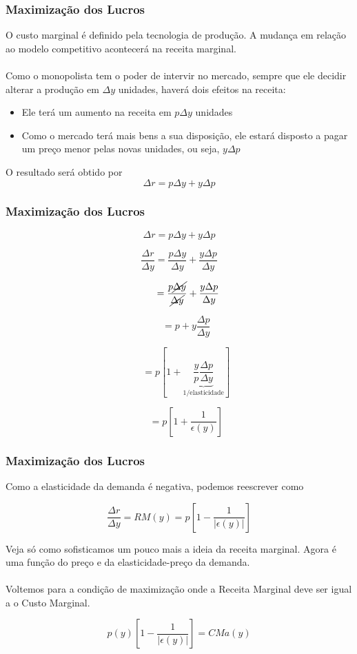 \documentclass{beamer}[10]
\begin{document}
\begin{frame}
	\frametitle{Maximização dos Lucros}

	O custo marginal é definido pela tecnologia de produção. A mudança em relação ao modelo competitivo acontecerá na receita marginal.
	\\~\\
	Como o monopolista tem o poder de intervir no mercado, sempre que ele decidir alterar a produção em $\Delta y$ unidades, haverá dois efeitos na receita:
	\begin{itemize}
		\item Ele terá um aumento na receita em $p\Delta y$ unidades
		\item Como o mercado terá mais bens a sua disposição, ele estará disposto a pagar um preço menor pelas novas unidades, ou seja, $y\Delta p$
	\end{itemize}

	O resultado será obtido por
	$$\Delta r = p \Delta y + y \Delta p$$
\end{frame}

\begin{frame}
	\frametitle{Maximização dos Lucros}

	\small $$\Delta r = p \Delta y + y \Delta p$$

	$$ \frac{\Delta r}{\Delta y} = 
	\frac{p \Delta y}{\Delta y} + 
	\frac{y \Delta p}{\Delta y} $$

	$$ \phantom{\frac{\Delta r}{\Delta y}} = 
	\frac{p \cancel{\Delta y}}{\cancel{\Delta y}} + 
	\frac{y \Delta p}{\Delta y} $$

	$$ \phantom{\frac{\Delta r}{\Delta y}} = p + y\frac{\Delta p}{\Delta y} $$

	$$ \phantom{\frac{\Delta r}{\Delta y}} = 
	p \left[ 1 + \underbrace{\frac{y}{p}\frac{\Delta p}{\Delta y}}_\text{1/elasticidade} \right] $$

	$$ \phantom{\frac{\Delta r}{\Delta y}} = 
	p \left[ 1 + \frac{1}{\epsilon(y)} \right] $$
\end{frame}

\begin{frame}
	\frametitle{Maximização dos Lucros}

	Como a elasticidade da demanda é negativa, podemos reescrever como

	$$ \frac{\Delta r}{\Delta y} = 
	RM(y) =
	p \left[ 1 - \frac{1}{|\epsilon(y)|} \right] $$

	Veja só como sofisticamos um pouco mais a ideia da receita marginal. Agora é uma função do preço e da elasticidade-preço da demanda.
	\\~\\
	Voltemos para a condição de maximização onde a Receita Marginal deve ser igual a o Custo Marginal.

	$$ p(y) \left[ 1 - \frac{1}{|\epsilon(y)|} \right] = CMa(y) $$
\end{frame}
\end{document}
